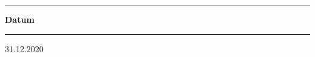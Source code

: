 \begin{titlepage}
\begin{minipage}[b]{0.84\textwidth}
	\begin{minipage}[b]{0.27\textwidth}
	\hrule\vskip 0.5cm
		\textbf{Datum}
	\end{minipage}
	\begin{minipage}[b]{0.03\textwidth}
	\hskip 0.5cm
	\end{minipage}
	\begin{minipage}[b]{0.7\textwidth}
	\hrule\vskip 0.5cm
		31.12.2020
	\end{minipage}
\end{minipage}
\vskip 0.5cm


\end{titlepage}
